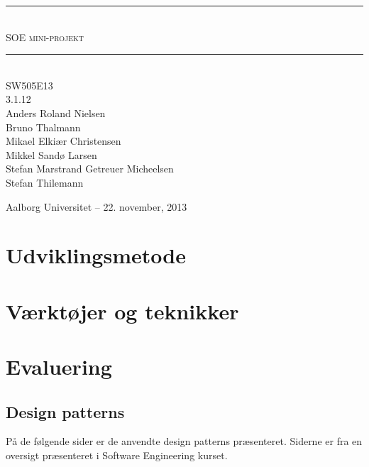 



\begin{titlepage}
\newcommand{\HRule}{\rule{\linewidth}{0.5mm}}

\begin{center}

\HRule \\[0.5cm]
\textsc{ \Huge SOE mini-projekt}\\[0.3cm]

\HRule \\[1cm]

\textsc{\Large SW505E13 \\ 3.1.12}\\[0.5cm]

{\large
Anders Roland Nielsen \\
Bruno Thalmann \\
Mikael Elkiær Christensen \\
Mikkel Sandø Larsen \\
Stefan Marstrand Getreuer Micheelsen \\
Stefan Thilemann
}

\vfill

{\large Aalborg Universitet -- 22. november, 2013}

\end{center}

\end{titlepage}

\tableofcontents

\chapter{Udviklingsmetode}\label{udviklingsmetode}

\chapter{Værktøjer og teknikker}

\chapter{Evaluering}



\begin{appendices}
\chapter{Design patterns}
\label{appendix:patterns}
På de følgende sider er de anvendte design patterns præsenteret.
Siderne er fra en oversigt præsenteret i Software Engineering kurset.

\end{appendices}

